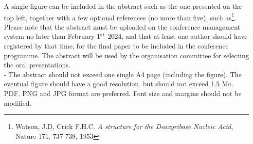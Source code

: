 \documentclass[a4,fullpage,twoside,12pt]{report}
\begin{document}
A single figure can be included in the abstract such as the one 
presented on the top left, together with a few optional references (no more than five), such as\footnote{%
Watson, J.D, Crick F.H.C, \emph{A structure for the Deoxyribose Nucleic Acid}, Nature 171, 737-738, 1953}.  
Please note that the abstract must be uploaded on the conference management
system no later than February 1$^{\mbox{\scriptsize st}}$ 2024, and that at least one author should have registered by that time,
for the final paper to be included in the conference programme. The abstract will be used by the organisation committee 
for selecting the oral presentations. \\

 - The abstract should not exceed one single A4 page (including the figure).
The eventual figure should have a good resolution, but should not exceed 1.5 Mo. PDF, PNG and
JPG format are preferred. Font size and margins should not be modified.\\

\vfill

\pagebreak
\newpage
\end{document}

